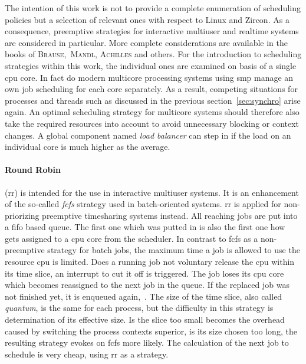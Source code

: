 The intention of this work is not to provide a complete enumeration of scheduling policies but a selection of relevant ones with respect to Linux and Zircon.
As a consequence, preemptive strategies for interactive multiuser and realtime systems are considered in particular.
More complete considerations are available in the books of \textsc{Brause}\cite{brause2017betriebssysteme},~\textsc{Mandl}\cite{mandl2014Grundkurs}, \textsc{Achilles}\cite{achilles2006betriebssysteme} and others.
For the introduction to scheduling strategies within this work, the individual ones are examined on basis of a single \ac{cpu} core.
In fact do modern multicore processing systems using \ac{smp} manage an own job scheduling for each core separately.
As a result, competing situations for processes and threads such as discussed in the previous section~\ref{sec:synchro} arise again.
An optimal scheduling strategy for multicore systems should therefore also take the required resources into account to avoid unnecessary blocking or context changes\cite{brause2017betriebssysteme}.
A global component named \textit{load balancer} can step in if the load on an individual core is much higher as the average\cite{achilles2006betriebssysteme}.

\paragraph{Round Robin}
(\acs{rr}) is intended for the use in interactive multiuser systems.
It is an enhancement of the so-called \textit{\ac{fcfs}} strategy used in batch-oriented systems. 
\ac{rr} is applied for non-priorizing preemptive timesharing systems instead\cite{achilles2006betriebssysteme}.
All reaching jobs are put into a \ac{fifo} based queue.
The first one which was putted in is also the first one how gets assigned to a \ac{cpu} core from the scheduler.
In contrast to \ac{fcfs} as a non-preemptive strategy for batch jobs, the maximum time a job is allowed to use the resource \ac{cpu} is limited.
Does a running job not voluntary release the \ac{cpu} within its time slice, an interrupt to cut it off is triggered.
The job loses its \ac{cpu} core which becomes reassigned to the next job in the queue.
If the replaced job was not finished yet, it is enqueued again\cite{achilles2006betriebssysteme},~\cite{mandl2014Grundkurs}.
The size of the time slice, also called \textit{quantum}, is the same for each process, but the difficulty in this strategy is determination of its effective size\cite{brause2017betriebssysteme}.
Is the slice too small becomes the overhead caused by switching the process contexts superior, is its size chosen too long, the resulting strategy evokes on \ac{fcfs} more likely.
The calculation of the next job to schedule is very cheap, using \ac{rr} as a strategy\cite{brause2017betriebssysteme}.

